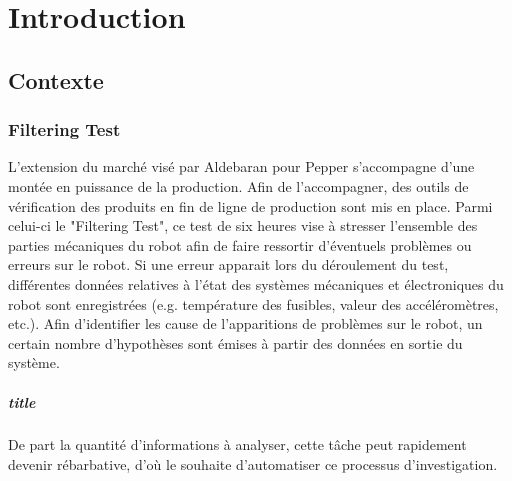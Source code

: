 \chapter{Introduction}
\label{Introduction}
\thispagestyle{fancy}

\section{Contexte}
\label{Introduction:Contexte}

\subsection{Filtering Test}
\label{Introduction:Contexte:Filtering Test}
L'extension du marché visé par Aldebaran pour Pepper s'accompagne d'une montée en puissance de la production. Afin de l'accompagner, des outils de vérification des produits en fin de ligne de production sont mis en place. Parmi celui-ci le "Filtering Test", ce test de six heures vise à stresser l'ensemble des parties mécaniques du robot afin de faire ressortir d'éventuels problèmes ou erreurs sur le robot. Si une erreur apparait lors du déroulement du test, différentes données relatives à l'état des systèmes mécaniques et électroniques du robot sont enregistrées (e.g. température des fusibles, valeur des accéléromètres, etc.). Afin d'identifier les cause de l'apparitions de problèmes sur le robot, un certain nombre d'hypothèses sont émises à partir des données en sortie du système. 

\paragraph{title}



De part la quantité d'informations à analyser, cette tâche peut rapidement devenir rébarbative, d'où le souhaite d'automatiser ce processus d'investigation.
